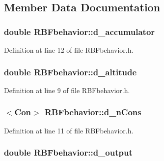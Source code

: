 \subsection{Member Data Documentation}
\hypertarget{class_r_b_fbehavior_a275688a12adb637bfb849f26b20df538}{
\subsubsection[{d\_\-accumulator}]{\setlength{\rightskip}{0pt plus 5cm}double {\bf RBFbehavior::d\_\-accumulator}}}
\label{class_r_b_fbehavior_a275688a12adb637bfb849f26b20df538}


Definition at line 12 of file RBFbehavior.h.

\hypertarget{class_r_b_fbehavior_a831ab08f316756149ff37a92098f7033}{
\subsubsection[{d\_\-altitude}]{\setlength{\rightskip}{0pt plus 5cm}double {\bf RBFbehavior::d\_\-altitude}}}
\label{class_r_b_fbehavior_a831ab08f316756149ff37a92098f7033}


Definition at line 9 of file RBFbehavior.h.

\hypertarget{class_r_b_fbehavior_a9a73da1fba335fd346706ded6166f3f1}{
\subsubsection[{d\_\-nCons}]{$<${\bf Con}$>$ {\bf RBFbehavior::d\_\-nCons}}}
\label{class_r_b_fbehavior_a9a73da1fba335fd346706ded6166f3f1}


Definition at line 11 of file RBFbehavior.h.

\hypertarget{class_r_b_fbehavior_a73826fb24b1ef473ea546babbb4bdbd2}{
\subsubsection[{d\_\-output}]{\setlength{\rightskip}{0pt plus 5cm}double {\bf RBFbehavior::d\_\-output}}}
\label{class_r_b_fbehavior_a73826fb24b1ef473ea546babbb4bdbd2}


